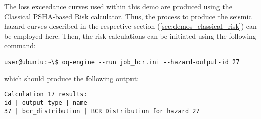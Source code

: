 The loss exceedance curves used within this demo are produced using the
Classical PSHA-based Risk calculator. Thus, the process to produce the seismic
hazard curves described in the respective section
(\ref{sec:demos_classical_risk}) can be employed here. Then, the risk
calculations can be initiated using the following command:

\begin{Verbatim}[frame=single, commandchars=\\\{\}, samepage=true]
user@ubuntu:~\$ oq-engine --run job_bcr.ini --hazard-output-id 27
\end{Verbatim}

which should produce the following output:

\begin{Verbatim}[frame=single, commandchars=\\\{\}, samepage=true]
Calculation 17 results:
id | output_type | name
37 | bcr_distribution | BCR Distribution for hazard 27
\end{Verbatim}
